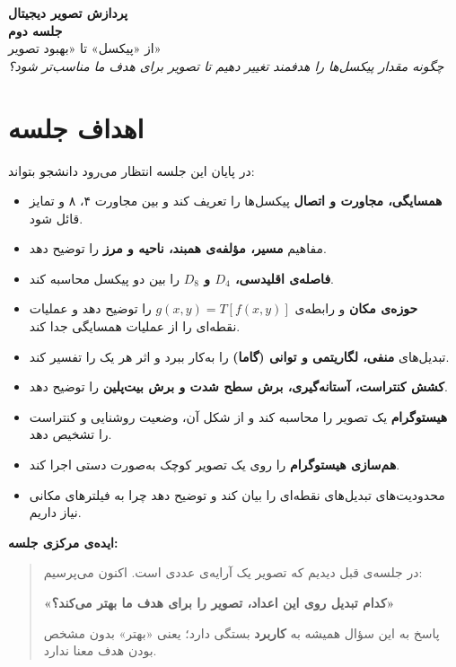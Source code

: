 \documentclass[11pt,a4paper]{article}
\begin{document}
	
	\begin{center}
		{\LARGE \textbf{پردازش تصویر دیجیتال}}\\[0.4cm]
		{\Large \textbf{جلسه دوم}}\\[0.3cm]
		{\large از «پیکسل» تا «بهبود تصویر»}\\[0.5cm]
		\textit{چگونه مقدار پیکسل‌ها را هدفمند تغییر دهیم تا تصویر برای هدف ما مناسب‌تر شود؟}
	\end{center}
	
	\vspace{0.3cm}
	
	\section{اهداف جلسه}
	
	در پایان این جلسه انتظار می‌رود دانشجو بتواند:
	
	\begin{itemize}
		\item \textbf{همسایگی، مجاورت و اتصال} پیکسل‌ها را تعریف کند و بین مجاورت ۴، ۸ و  تمایز قائل شود.
		\item مفاهیم \textbf{مسیر، مؤلفه‌ی همبند، ناحیه و مرز} را توضیح دهد.
		\item \textbf{فاصله‌ی اقلیدسی، $D_4$ و $D_8$} را بین دو پیکسل محاسبه کند.
		\item \textbf{حوزه‌ی مکان} و رابطه‌ی $g(x,y)=T[f(x,y)]$ را توضیح دهد و عملیات نقطه‌ای را از عملیات همسایگی جدا کند.
		\item تبدیل‌های \textbf{منفی، لگاریتمی و توانی (گاما)} را به‌کار ببرد و اثر هر یک را تفسیر کند.
		\item \textbf{کشش کنتراست، آستانه‌گیری، برش سطح شدت و برش بیت‌پلین} را توضیح دهد.
		\item \textbf{هیستوگرام} یک تصویر را محاسبه کند و از شکل آن، وضعیت روشنایی و کنتراست را تشخیص دهد.
		\item \textbf{هم‌سازی هیستوگرام} را روی یک تصویر کوچک به‌صورت دستی اجرا کند.
		\item محدودیت‌های تبدیل‌های نقطه‌ای را بیان کند و توضیح دهد چرا به فیلترهای مکانی نیاز داریم.
	\end{itemize}
	
	\vspace{0.3cm}
	
	\noindent
	\textbf{ایده‌ی مرکزی جلسه:}
	
	\begin{quote}
		در جلسه‌ی قبل دیدیم که تصویر یک آرایه‌ی عددی است. اکنون می‌پرسیم:
		
		\begin{center}
			\textbf{«کدام تبدیل روی این اعداد، تصویر را برای هدف ما بهتر می‌کند؟»}
		\end{center}
		
		پاسخ به این سؤال همیشه به \textbf{کاربرد} بستگی دارد؛ یعنی «بهتر» بدون مشخص بودن هدف معنا ندارد.
	\end{quote}
	
\end{document}
